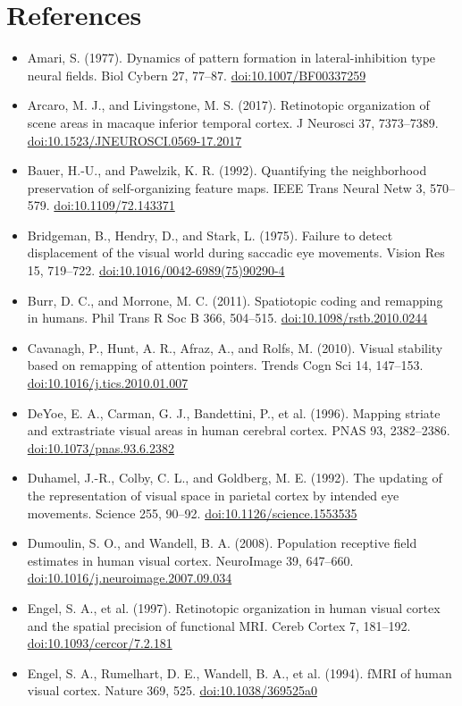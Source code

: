 \documentclass[11pt,a4paper]{article}
\newcommand{\doi}[1]{\href{https://doi.org/#1}{doi:#1}}
\begin{document}
\section*{References}

\begin{itemize}[itemsep=1pt,topsep=2pt]\small
  \item Amari, S. (1977). Dynamics of pattern formation in lateral-inhibition type neural fields. Biol Cybern 27, 77--87. \doi{10.1007/BF00337259}
  \item Arcaro, M. J., and Livingstone, M. S. (2017). Retinotopic organization of scene areas in macaque inferior temporal cortex. J Neurosci 37, 7373--7389. \doi{10.1523/JNEUROSCI.0569-17.2017}
  \item Bauer, H.-U., and Pawelzik, K. R. (1992). Quantifying the neighborhood preservation of self-organizing feature maps. IEEE Trans Neural Netw 3, 570--579. \doi{10.1109/72.143371}
  \item Bridgeman, B., Hendry, D., and Stark, L. (1975). Failure to detect displacement of the visual world during saccadic eye movements. Vision Res 15, 719--722. \doi{10.1016/0042-6989(75)90290-4}
  \item Burr, D. C., and Morrone, M. C. (2011). Spatiotopic coding and remapping in humans. Phil Trans R Soc B 366, 504--515. \doi{10.1098/rstb.2010.0244}
  \item Cavanagh, P., Hunt, A. R., Afraz, A., and Rolfs, M. (2010). Visual stability based on remapping of attention pointers. Trends Cogn Sci 14, 147--153. \doi{10.1016/j.tics.2010.01.007}
  \item DeYoe, E. A., Carman, G. J., Bandettini, P., et al. (1996). Mapping striate and extrastriate visual areas in human cerebral cortex. PNAS 93, 2382--2386. \doi{10.1073/pnas.93.6.2382}
  \item Duhamel, J.-R., Colby, C. L., and Goldberg, M. E. (1992). The updating of the representation of visual space in parietal cortex by intended eye movements. Science 255, 90--92. \doi{10.1126/science.1553535}
  \item Dumoulin, S. O., and Wandell, B. A. (2008). Population receptive field estimates in human visual cortex. NeuroImage 39, 647--660. \doi{10.1016/j.neuroimage.2007.09.034}
  \item Engel, S. A., et al. (1997). Retinotopic organization in human visual cortex and the spatial precision of functional MRI. Cereb Cortex 7, 181--192. \doi{10.1093/cercor/7.2.181}
  \item Engel, S. A., Rumelhart, D. E., Wandell, B. A., et al. (1994). fMRI of human visual cortex. Nature 369, 525. \doi{10.1038/369525a0}

\end{itemize}
\end{document}

